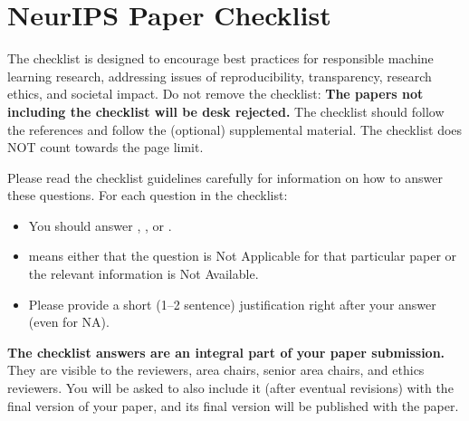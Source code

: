 \documentclass{article}
\begin{document}


\newpage
\section*{NeurIPS Paper Checklist}

The checklist is designed to encourage best practices for responsible machine learning research, addressing issues of reproducibility, transparency, research ethics, and societal impact. Do not remove the checklist: {\bf The papers not including the checklist will be desk rejected.} The checklist should follow the references and follow the (optional) supplemental material.  The checklist does NOT count towards the page
limit. 

Please read the checklist guidelines carefully for information on how to answer these questions. For each question in the checklist:
\begin{itemize}
    \item You should answer \answerYes{}, \answerNo{}, or \answerNA{}.
    \item \answerNA{} means either that the question is Not Applicable for that particular paper or the relevant information is Not Available.
    \item Please provide a short (1–2 sentence) justification right after your answer (even for NA). 
\end{itemize}

{\bf The checklist answers are an integral part of your paper submission.} They are visible to the reviewers, area chairs, senior area chairs, and ethics reviewers. You will be asked to also include it (after eventual revisions) with the final version of your paper, and its final version will be published with the paper.
\end{document}
